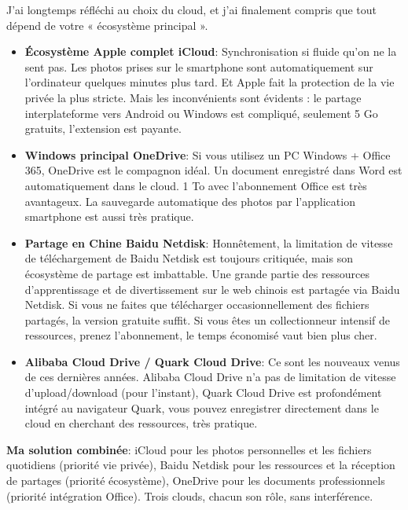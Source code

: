
J'ai longtemps réfléchi au choix du cloud, et j'ai finalement compris que tout dépend de votre « écosystème principal ».

\begin{itemize}
  \item \textbf{Écosystème Apple complet iCloud}: Synchronisation si fluide qu'on ne la sent pas. Les photos prises sur le smartphone sont automatiquement sur l'ordinateur quelques minutes plus tard. Et Apple fait la protection de la vie privée la plus stricte. Mais les inconvénients sont évidents : le partage interplateforme vers Android ou Windows est compliqué, seulement 5 Go gratuits, l'extension est payante.
  \item \textbf{Windows principal OneDrive}: Si vous utilisez un PC Windows + Office 365, OneDrive est le compagnon idéal. Un document enregistré dans Word est automatiquement dans le cloud. 1 To avec l'abonnement Office est très avantageux. La sauvegarde automatique des photos par l'application smartphone est aussi très pratique.
  \item \textbf{Partage en Chine Baidu Netdisk}: Honnêtement, la limitation de vitesse de téléchargement de Baidu Netdisk est toujours critiquée, mais son écosystème de partage est imbattable. Une grande partie des ressources d'apprentissage et de divertissement sur le web chinois est partagée via Baidu Netdisk. Si vous ne faites que télécharger occasionnellement des fichiers partagés, la version gratuite suffit. Si vous êtes un collectionneur intensif de ressources, prenez l'abonnement, le temps économisé vaut bien plus cher.
  \item \textbf{Alibaba Cloud Drive / Quark Cloud Drive}: Ce sont les nouveaux venus de ces dernières années. Alibaba Cloud Drive n'a pas de limitation de vitesse d'upload/download (pour l'instant), Quark Cloud Drive est profondément intégré au navigateur Quark, vous pouvez enregistrer directement dans le cloud en cherchant des ressources, très pratique.
\end{itemize}

\textbf{Ma solution combinée}: iCloud pour les photos personnelles et les fichiers quotidiens (priorité vie privée), Baidu Netdisk pour les ressources et la réception de partages (priorité écosystème), OneDrive pour les documents professionnels (priorité intégration Office). Trois clouds, chacun son rôle, sans interférence.

